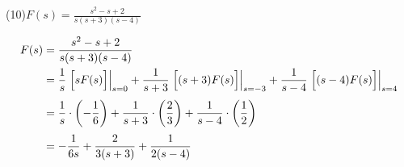 \documentclass[a4paper,12pt]{report}
\begin{document}
  (10)\quad \( F(s) = \frac{s^2 - s + 2}{s(s+3)(s-4)} \)

  \begin{align*}
    F(s) &= \frac{s^2 - s + 2}{s(s+3)(s-4)} \\
         &= \frac{1}{s} \left.\Bigl[sF(s)\Bigr]\right|_{s=0}
          + \frac{1}{s+3} \left.\Bigl[(s+3)F(s)\Bigr]\right|_{s=-3}
          + \frac{1}{s-4} \left.\Bigl[(s-4)F(s)\Bigr]\right|_{s=4} \\[1mm]
         &= \frac{1}{s} \cdot \left(-\frac{1}{6}\right)
          + \frac{1}{s+3} \cdot \left(\frac{2}{3}\right)
          + \frac{1}{s-4} \cdot \left(\frac{1}{2}\right) \\[1mm]
         &= -\frac{1}{6s} + \frac{2}{3(s+3)} + \frac{1}{2(s-4)}
  \end{align*}
\end{document}
